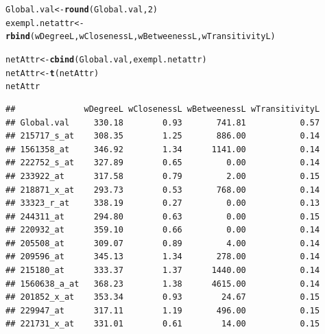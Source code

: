 \documentclass[12pt]{article}\usepackage[]{graphicx}\usepackage[usenames,dvipsnames]{color}
\makeatletter
\newcommand{\hlnum}[1]{\textcolor[rgb]{0.686,0.059,0.569}{#1}}%
\newcommand{\hlstd}[1]{\textcolor[rgb]{0.345,0.345,0.345}{#1}}%
\newcommand{\hlkwb}[1]{\textcolor[rgb]{0.69,0.353,0.396}{#1}}%
\newcommand{\hlkwd}[1]{\textcolor[rgb]{0.737,0.353,0.396}{\textbf{#1}}}%
\newenvironment{kframe}{%
 \def\at@end@of@kframe{}%
 \ifinner\ifhmode%
  \def\at@end@of@kframe{\end{minipage}}%
  \begin{minipage}{\columnwidth}%
 \fi\fi%
 \def\FrameCommand##1{\hskip\@totalleftmargin \hskip-\fboxsep
 \colorbox{shadecolor}{##1}\hskip-\fboxsep
     \hskip-\linewidth \hskip-\@totalleftmargin \hskip\columnwidth}%
 \MakeFramed {\advance\hsize-\width
   \@totalleftmargin\z@ \linewidth\hsize
   \@setminipage}}%
 {\par\unskip\endMakeFramed%
 \at@end@of@kframe}
\newenvironment{knitrout}{}{} %
\makeatother
\begin{document}
\begin{knitrout}
\color{fgcolor}\begin{kframe}
\begin{alltt}
\hlstd{Global.val} \hlkwb{<-} \hlkwd{round}\hlstd{(Global.val,} \hlnum{2}\hlstd{)}
\hlstd{exempl.netattr} \hlkwb{<-} \hlkwd{rbind}\hlstd{(wDegreeL, wClosenessL, wBetweenessL, wTransitivityL)}
\end{alltt}
\end{kframe}
\end{knitrout}
\begin{knitrout}
\color{fgcolor}\begin{kframe}
\begin{alltt}
\hlstd{netAttr} \hlkwb{<-} \hlkwd{cbind}\hlstd{(Global.val, exempl.netattr)}
\hlstd{netAttr} \hlkwb{<-} \hlkwd{t}\hlstd{(netAttr)}
\hlstd{netAttr}
\end{alltt}
\begin{verbatim}
##              wDegreeL wClosenessL wBetweenessL wTransitivityL
## Global.val     330.18        0.93       741.81           0.57
## 215717_s_at    308.35        1.25       886.00           0.14
## 1561358_at     346.92        1.34      1141.00           0.14
## 222752_s_at    327.89        0.65         0.00           0.14
## 233922_at      317.58        0.79         2.00           0.15
## 218871_x_at    293.73        0.53       768.00           0.14
## 33323_r_at     338.19        0.27         0.00           0.13
## 244311_at      294.80        0.63         0.00           0.15
## 220932_at      359.10        0.66         0.00           0.14
## 205508_at      309.07        0.89         4.00           0.14
## 209596_at      345.13        1.34       278.00           0.14
## 215180_at      333.37        1.37      1440.00           0.14
## 1560638_a_at   368.23        1.38      4615.00           0.14
## 201852_x_at    353.34        0.93        24.67           0.15
## 229947_at      317.11        1.19       496.00           0.15
## 221731_x_at    331.01        0.61        14.00           0.15
\end{verbatim}
\end{kframe}
\end{knitrout}
\end{document}
